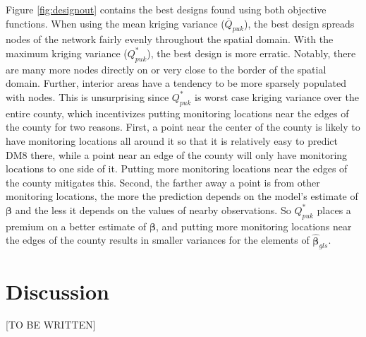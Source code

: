 \documentclass[cmbright]{staauth}
\begin{document}
Figure \ref{fig:designout} contains the best designs found using both objective functions. When using the mean kriging variance ($\overline{Q}_{puk}$), the best design spreads nodes of the network fairly evenly throughout the spatial domain. With the maximum kriging variance ($Q^*_{puk}$), the best design is more erratic. Notably, there are many more nodes directly on or very close to the border of the spatial domain. Further, interior areas have a tendency to be more sparsely populated with nodes. This is unsurprising since $Q^*_{puk}$ is worst case kriging variance over the entire county, which incentivizes putting monitoring locations near the edges of the county for two reasons. First, a point near the center of the county is likely to have monitoring locations all around it so that it is relatively easy to predict DM8 there, while a point near an edge of the county will only have monitoring locations to one side of it. Putting more monitoring locations near the edges of the county mitigates this. Second, the farther away a point is from other monitoring locations, the more the prediction depends on the model's estimate of $\bm{\beta}$ and the less it depends on the values of nearby observations. So $Q^*_{puk}$ places a premium on a better estimate of $\bm{\beta}$, and putting more monitoring locations near the edges of the county results in smaller variances for the elements of $\widehat{\bm{\beta}}_{gls}$. 

\section{Discussion}\label{sec:discuss}
[TO BE WRITTEN]



\end{document}
